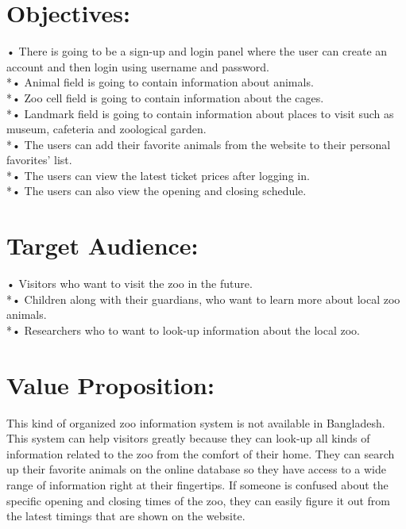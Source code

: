 \documentclass{article}
\begin{document}
\newpage
\section{Objectives:}
{\flushleft
•	There is going to be a sign-up and login panel where the user can create an account and then login using username and password.
\\*•	Animal field is going to contain information about animals.
\\*•	Zoo cell field is going to contain information about the cages.
\\*•	Landmark field is going to contain information about places to visit such as museum, cafeteria and zoological garden.
\\*•	The users can add their favorite animals from the website to their personal favorites’ list.
\\*•	The users can view the latest ticket prices after logging in.
\\*•	The users can also view the opening and closing schedule.


}

\vspace{8mm}

\section{Target Audience:}
{\flushleft

•	Visitors who want to visit the zoo in the future.
\\*•	Children along with their guardians, who want to learn more about local zoo animals.
\\*•	Researchers who to want to look-up information about the local zoo.



}
\newpage
\section{Value Proposition:}
{\flushleft

This kind of organized zoo information system is not available in Bangladesh. This system can help visitors greatly because they can look-up all kinds of information related to the zoo from the comfort of their home. They can search up their favorite animals on the online database so they have access to a wide range of information right at their fingertips. If someone is confused about the specific opening and closing times of the zoo, they can easily figure it out from the latest timings that are shown on the website.



}
\end{document}
